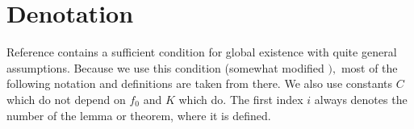{  %
  
  
  
  
  
  
  
  \section{Denotation}
  
Reference \cite{HorstClasssicalI} contains a sufficient condition for global existence with quite general assumptions. Because we use this condition (somewhat modified $),$ most of the following notation and definitions are taken from there. We also use constants $C$ which do not depend on $f_0$ and $K$ which do. The first index $i$ always denotes the number of the lemma or theorem, where it is defined.

}
